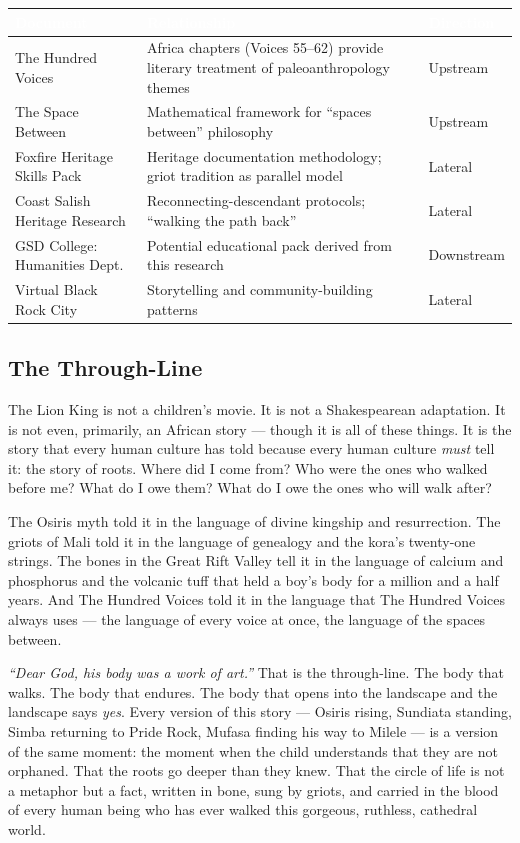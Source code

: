 \documentclass[11pt,letterpaper]{article}
\newcommand{\tableheader}[1]{\textbf{\sffamily\textcolor{white}{#1}}}
\begin{document}
\begin{center}
\begin{tabularx}{\textwidth}{L{4.5cm}XC{2cm}}
\toprule
{}
\tableheader{Document} & \tableheader{Relationship} & \tableheader{Direction} \\
\midrule
The Hundred Voices & Africa chapters (Voices 55--62) provide literary treatment of paleoanthropology themes & Upstream \\
The Space Between & Mathematical framework for ``spaces between'' philosophy & Upstream \\
Foxfire Heritage Skills Pack & Heritage documentation methodology; griot tradition as parallel model & Lateral \\
Coast Salish Heritage Research & Reconnecting-descendant protocols; ``walking the path back'' & Lateral \\
GSD College: Humanities Dept. & Potential educational pack derived from this research & Downstream \\
Virtual Black Rock City & Storytelling and community-building patterns & Lateral \\
\bottomrule
\end{tabularx}
\end{center}

\subsection{The Through-Line}

\begin{quotebox}
The Lion King is not a children's movie. It is not a Shakespearean adaptation. It is not even, primarily, an African story --- though it is all of these things. It is the story that every human culture has told because every human culture \textit{must} tell it: the story of roots. Where did I come from? Who were the ones who walked before me? What do I owe them? What do I owe the ones who will walk after?

The Osiris myth told it in the language of divine kingship and resurrection. The griots of Mali told it in the language of genealogy and the kora's twenty-one strings. The bones in the Great Rift Valley tell it in the language of calcium and phosphorus and the volcanic tuff that held a boy's body for a million and a half years. And The Hundred Voices told it in the language that The Hundred Voices always uses --- the language of every voice at once, the language of the spaces between.

\textit{``Dear God, his body was a work of art.''} That is the through-line. The body that walks. The body that endures. The body that opens into the landscape and the landscape says \textit{yes}. Every version of this story --- Osiris rising, Sundiata standing, Simba returning to Pride Rock, Mufasa finding his way to Milele --- is a version of the same moment: the moment when the child understands that they are not orphaned. That the roots go deeper than they knew. That the circle of life is not a metaphor but a fact, written in bone, sung by griots, and carried in the blood of every human being who has ever walked this gorgeous, ruthless, cathedral world.
\end{quotebox}
\end{document}
